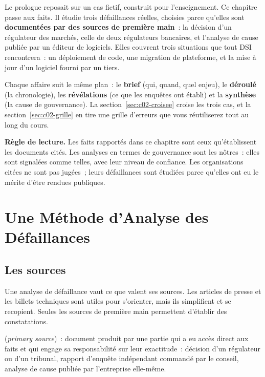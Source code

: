 Le prologue reposait sur un cas fictif, construit pour l'enseignement. Ce
chapitre passe aux faits. Il étudie trois défaillances réelles, choisies
parce qu'elles sont \textbf{documentées par des sources de première main}~:
la décision d'un régulateur des marchés, celle de deux régulateurs
bancaires, et l'analyse de cause publiée par un éditeur de logiciels. Elles
couvrent trois situations que tout DSI rencontrera~: un déploiement de
code, une migration de plateforme, et la mise à jour d'un logiciel fourni
par un tiers.

Chaque affaire suit le même plan~: le \textbf{brief} (qui, quand, quel
enjeu), le \textbf{déroulé} (la chronologie), les \textbf{révélations}
(ce que les enquêtes ont établi) et la \textbf{synthèse} (la cause de
gouvernance). La section~\ref{sec:c02-croisee} croise les trois cas, et
la section~\ref{sec:c02-grille} en tire une grille d'erreurs que vous
réutiliserez tout au long du cours.

\begin{boxalert}
\textbf{Règle de lecture.} Les faits rapportés dans ce chapitre sont ceux
qu'établissent les documents cités. Les analyses en termes de gouvernance
sont les nôtres~: elles sont signalées comme telles, avec leur niveau de
confiance. Les organisations citées ne sont pas jugées~; leurs défaillances
sont étudiées parce qu'elles ont eu le mérite d'être rendues publiques.
\end{boxalert}

\separateur

\section{Une Méthode d'Analyse des Défaillances}
\label{sec:c02-methode}

\subsection{Les sources}

Une analyse de défaillance vaut ce que valent ses sources. Les articles de
presse et les billets techniques sont utiles pour s'orienter, mais ils
simplifient et se recopient. Seules les sources de première main
permettent d'établir des constatations.

\begin{boxdef}
(\textit{primary source})~: document produit par une partie qui a eu
accès direct aux faits et qui engage sa responsabilité sur leur
exactitude~: décision d'un régulateur ou d'un tribunal, rapport d'enquête
indépendant commandé par le conseil, analyse de cause publiée par
l'entreprise elle-même.
\end{boxdef}

